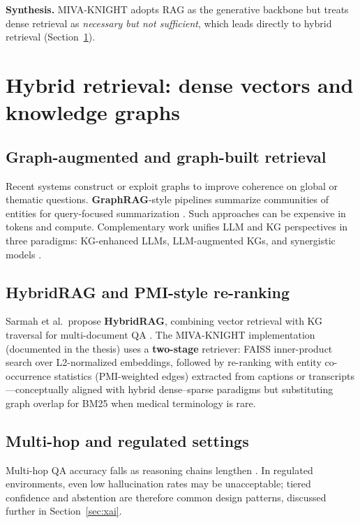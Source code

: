 \documentclass[12pt,a4paper]{article}
\begin{document}
\textbf{Synthesis.} MIVA-KNIGHT adopts RAG as the generative backbone but treats dense retrieval as \emph{necessary but not sufficient}, which leads directly to hybrid retrieval (Section~\ref{sec:hybrid}).

\section{Hybrid retrieval: dense vectors and knowledge graphs}
\label{sec:hybrid}

\subsection{Graph-augmented and graph-built retrieval}

Recent systems construct or exploit graphs to improve coherence on global or thematic questions. \textbf{GraphRAG}-style pipelines summarize communities of entities for query-focused summarization \cite{edge2024graphrag}. Such approaches can be expensive in tokens and compute. Complementary work unifies LLM and KG perspectives in three paradigms: KG-enhanced LLMs, LLM-augmented KGs, and synergistic models \cite{pan2024unifying}.

\subsection{HybridRAG and PMI-style re-ranking}

Sarmah et al.\ propose \textbf{HybridRAG}, combining vector retrieval with KG traversal for multi-document QA \cite{sarmah2024hybridrag}. The MIVA-KNIGHT implementation (documented in the thesis) uses a \textbf{two-stage} retriever: FAISS inner-product search over L2-normalized embeddings, followed by re-ranking with entity co-occurrence statistics (PMI-weighted edges) extracted from captions or transcripts---conceptually aligned with hybrid dense--sparse paradigms \cite{karpukhin2020dense} but substituting graph overlap for BM25 when medical terminology is rare.

\subsection{Multi-hop and regulated settings}

Multi-hop QA accuracy falls as reasoning chains lengthen \cite{tang2024multihop}. In regulated environments, even low hallucination rates may be unacceptable; tiered confidence and abstention are therefore common design patterns, discussed further in Section~\ref{sec:xai}.
\end{document}
